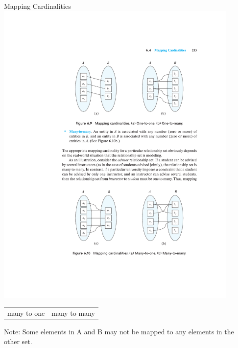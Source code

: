 \documentclass{beamer}
\begin{document}
\begin{frame}{Mapping Cardinalities}
    \centering
    \includegraphics[trim={6.75cm 5cm 3.75cm 17cm}, clip, width=0.9\textwidth]{figures/p253}
    \begin{tabularx}{\textwidth}{@{} Y Y @{}}
        many to one & many to many \\
    \end{tabularx}
    \begin{block}{Note:}
        Some elements in A and B may not be mapped to any elements in the other set.
    \end{block}
\end{frame}
\end{document}
